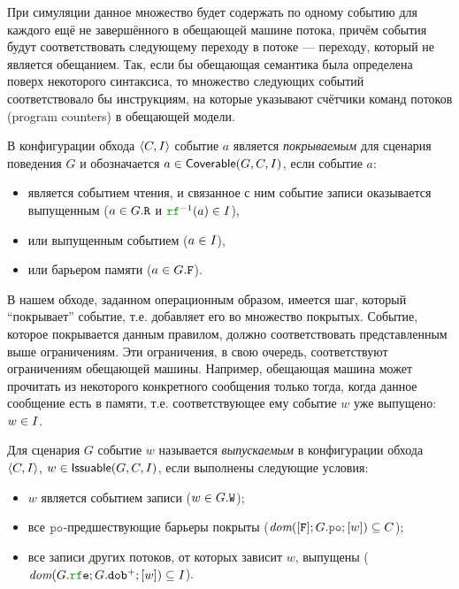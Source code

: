 При симуляции данное множество будет содержать по одному событию для каждого ещё не завершённого в обещающей машине потока,
причём события будут соответствовать следующему переходу в потоке --- переходу, который не является обещанием.
Так, если бы обещающая семантика была определена поверх некоторого синтаксиса, то множество
следующих событий соответствовало бы инструкциям, на которые указывают счётчики команд  потоков (program counters)
в обещающей модели.
\begin{definition}
В конфигурации обхода ${\langle{C, I}\rangle}$ событие $a$ является \emph{покрываемым} для сценария поведения $G$
и обозначается $a\in {\sf Coverable}(G, C, I)$, если событие $a$:
  \begin{itemize}
    \item является событием чтения, и связанное с ним событие записи оказывается выпущенным ($a \in G.{\mathtt{R}}$ и $\lRF^{-1}(a) \in \IssuedSet$),
    \item или выпущенным событием ($a \in I$),
    \item или барьером памяти ($a \in G.{\mathtt{F}}$).
  \end{itemize}
\end{definition}
В нашем обходе, заданном операционным образом, имеется шаг, который ``покрывает'' событие, т.е. добавляет
его во множество покрытых. Событие, которое покрывается данным правилом, должно соответствовать представленным выше ограничениям.
Эти ограничения, в свою очередь,  соответствуют ограничениям обещающей машины. Например, обещающая машина может 
прочитать из некоторого конкретного сообщения только тогда, когда данное сообщение есть в памяти,
т.е. соответствующее ему событие $w$ уже выпущено: $w \in I$.
\begin{definition}
Для сценария $G$ событие $w$ называется \emph{выпускаемым}
в конфигурации обхода ${\langle{C, I}\rangle}$,
$w\in{\sf Issuable}(G, C, I)$, если выполнены следующие условия:
      \begin{itemize}
        \item $w$ является событием записи ($w\in G.{\mathtt{W}}$);
        \item все $\lPO$-предшествующие барьеры покрыты
          ($\dom{[\lF];G.\lPO;[w]} \suq C$);
        \item все записи других потоков, от которых зависит $w$, выпущены
          ($\dom{G.\lRFE;G.\lDOB^{+};[w]} \suq \IssuedSet$).
      \end{itemize}
\end{definition}
